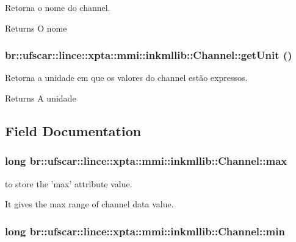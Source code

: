 Retorna o nome do channel. 

\begin{DoxyReturn}{Returns}
O nome 
\end{DoxyReturn}
\hypertarget{classbr_1_1ufscar_1_1lince_1_1xpta_1_1mmi_1_1inkmllib_1_1Channel_a961e5ef52b4db4b48ddd1a31441afa37}{
\subsubsection[{getUnit}]{ br::ufscar::lince::xpta::mmi::inkmllib::Channel::getUnit ()}}
\label{classbr_1_1ufscar_1_1lince_1_1xpta_1_1mmi_1_1inkmllib_1_1Channel_a961e5ef52b4db4b48ddd1a31441afa37}


Retorna a unidade em que os valores do channel estão expressos. 

\begin{DoxyReturn}{Returns}
A unidade 
\end{DoxyReturn}


\subsection{Field Documentation}
\hypertarget{classbr_1_1ufscar_1_1lince_1_1xpta_1_1mmi_1_1inkmllib_1_1Channel_a026225dffda8f84b452db591226cee12}{
\subsubsection[{max}]{\setlength{\rightskip}{0pt plus 5cm}long {\bf br::ufscar::lince::xpta::mmi::inkmllib::Channel::max}}}
\label{classbr_1_1ufscar_1_1lince_1_1xpta_1_1mmi_1_1inkmllib_1_1Channel_a026225dffda8f84b452db591226cee12}


to store the 'max' attribute value. 

It gives the max range of channel data value. \hypertarget{classbr_1_1ufscar_1_1lince_1_1xpta_1_1mmi_1_1inkmllib_1_1Channel_ac0ca63bd45cff57bd599ea6a74c3e205}{
\subsubsection[{min}]{\setlength{\rightskip}{0pt plus 5cm}long {\bf br::ufscar::lince::xpta::mmi::inkmllib::Channel::min}}}
\label{classbr_1_1ufscar_1_1lince_1_1xpta_1_1mmi_1_1inkmllib_1_1Channel_ac0ca63bd45cff57bd599ea6a74c3e205}


